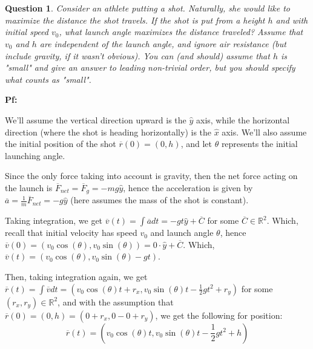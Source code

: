 \documentclass{article}
\newtheorem{question}{Question}
\newcommand{\RR}{\mathbb{R}}
\newcommand{\br}{\overline{r}}
\newcommand{\bv}{\overline{v}}
\newcommand{\ba}{\overline{a}}
\newcommand{\bF}{\overline{F}}
\begin{document}
\break

\section{}%
\begin{question}\label{q2}
    Consider an athlete putting a shot. Naturally, she would like to maximize the distance the shot travels. If the shot is put from a height $h$ and with initial speed $v_0$, what launch angle maximizes the distance traveled? Assume that $v_0$ and $h$ are independent of the launch angle, and ignore air resistance (but include gravity, if it wasn't obvious). You can (and should) assume that $h$ is "small" and give an answer to leading non-trivial order, but you should specify what counts as "small".
\end{question}

\textbf{Pf:}

We'll assume the vertical direction upward is the $\hat{y}$ axis, while the horizontal direction (where the shot is heading horizontally) is the $\hat{x}$ axis. We'll also assume the initial position of the shot $\br(0) = (0,h)$, and let $\theta$ represents the initial launching angle.

Since the only force taking into account is gravity, then the net force acting on the launch is $\bF_{net} = \bF_g = -mg\hat{y}$, hence the acceleration is given by $\ba = \frac{1}{m}\bF_{net} = -g\hat{y}$ (here assumes the mass of the shot is constant).

Taking integration, we get $\bv(t) = \int \ba dt = -gt\hat{y}+\overline{C}$ for some $\overline{C} \in \RR^2$. Which, recall that initial velocity has speed $v_0$ and launch angle $\theta$, hence $\bv(0) = (v_0\cos(\theta),v_0\sin(\theta)) = 0\cdot \hat{y}+\overline{C}$. Which, $\bv(t) = (v_0\cos(\theta), v_0\sin(\theta)-gt)$.

Then, taking integration again, we get $\br(t) = \int \bv dt = (v_0\cos(\theta)t + r_x, v_0\sin(\theta)t - \frac{1}{2}gt^2 + r_y)$ for some $(r_x,r_y)\in \RR^2$, and with the assumption that $\br(0) = (0,h) = (0+r_x, 0-0+r_y)$, we get the following for position:
$$\br(t) = \left(v_0\cos(\theta)t, v_0\sin(\theta)t-\frac{1}{2}gt^2+h\right)$$

\hfil
\end{document}
